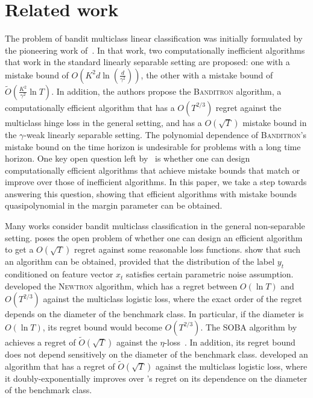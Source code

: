 \section{Related work}
\label{section:related-work}

The problem of bandit multiclass linear classification was initially formulated
by the pioneering work of~\citet{Kakade-Shalev-Shwartz-Tewari-2008}. In that
work, two computationally inefficient algorithms that work in the standard
linearly separable setting are proposed: one with a mistake bound of $O(K^2 d
\ln(\frac{d}{\gamma^2}))$, the other with a mistake bound of
$\widetilde{O}(\frac{K^2}{\gamma^2} \ln T)$. In addition, the authors propose
the \textsc{Banditron} algorithm, a computationally efficient algorithm that has
a $O(T^{2/3})$ regret against the multiclass hinge loss in the general setting,
and has a $O(\sqrt{T})$ mistake bound in the $\gamma$-weak linearly separable
setting. The polynomial dependence of \textsc{Banditron}'s mistake bound on the
time horizon is undesirable for problems with a long time horizon. One key open
question left by~\citet{Kakade-Shalev-Shwartz-Tewari-2008} is whether one can
design computationally efficient algorithms that achieve mistake bounds that
match or improve over those of inefficient algorithms. In this paper, we take a
step towards answering this question, showing that efficient algorithms with
mistake bounds quasipolynomial in the margin parameter can be obtained.


Many works consider bandit multiclass classification in the general
non-separable setting. \citet{Abernethy-Rakhlin-2009} poses the open problem of
whether one can design an efficient algorithm to get a $O(\sqrt{T})$ regret
against some reasonable loss functions. \citet{Crammer-Gentile-2013} show that
such an algorithm can be obtained, provided that the distribution of the label
$y_t$ conditioned on feature vector $x_t$ satisfies certain parametric noise
assumption. \citet{Hazan-Kale-2011} developed the \textsc{Newtron} algorithm,
which has a regret between $O(\ln T)$ and $O(T^{2/3})$ against the multiclass
logistic loss, where the exact order of the regret depends on the diameter of
the benchmark class. In particular, if the diameter is $O(\ln T)$, its regret
bound would become $O(T^{2/3})$. The \textsc{SOBA} algorithm by
\citet{Beygelzimer-Orabona-Zhang-2017} achieves a regret of
$\widetilde{O}(\sqrt{T})$ against the
$\eta$-loss~\citet{Orabona-Cesa-Bianchi-Gentile-2012}. In addition, its regret
bound does not depend sensitively on the diameter of the benchmark class.
\citet{Foster-Kale-Luo-Mohri-Sridharan-2018} developed an algorithm that has a
regret of $\widetilde{O}(\sqrt{T})$ against the multiclass logistic loss, where
it doubly-exponentially improves over \citet{Hazan-Kale-2011}'s regret on its
dependence on the diameter of the benchmark class.

